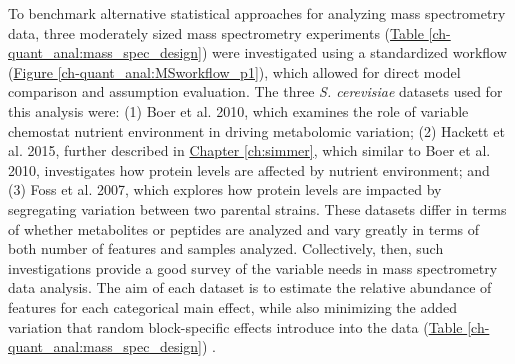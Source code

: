 To benchmark alternative statistical approaches for analyzing mass spectrometry data, three moderately sized mass spectrometry experiments (\hyperref[ch-quant_anal:mass_spec_design]{Table \ref{ch-quant_anal:mass_spec_design}}) were investigated using a standardized workflow (\hyperref[ch-quant_anal:MSworkflow_p1]{Figure \ref{ch-quant_anal:MSworkflow_p1}}), which allowed for direct model comparison and assumption evaluation.  The three \textit{S. cerevisiae} datasets used for this analysis were: (1) Boer et al. 2010, which examines the role of variable chemostat nutrient environment in driving metabolomic variation; (2) Hackett et al. 2015, further described in \hyperref[ch:simmer]{Chapter \ref{ch:simmer}}, which similar to Boer et al. 2010, investigates how protein levels are affected by nutrient environment; and (3) Foss et al. 2007, which explores how protein levels are impacted by segregating variation between two parental strains. These datasets differ in terms of whether metabolites or peptides are analyzed and vary greatly in terms of both number of features and samples analyzed. Collectively, then, such investigations provide a good survey of the variable needs in mass spectrometry data analysis. The aim of each dataset is to estimate the relative abundance of features for each categorical main effect, while also minimizing the added variation that random block-specific effects introduce into the data (\hyperref[ch-quant_anal:mass_spec_design]{Table \ref{ch-quant_anal:mass_spec_design}}) \cite{Bates:2013vy}.

\begin{table}[h!]
\begin{center}
\caption[Summary of benchmark datasets]{Summary of benchmark datasets}
\label{ch-quant_anal:mass_spec_design}
\end{center}
\end{table}


